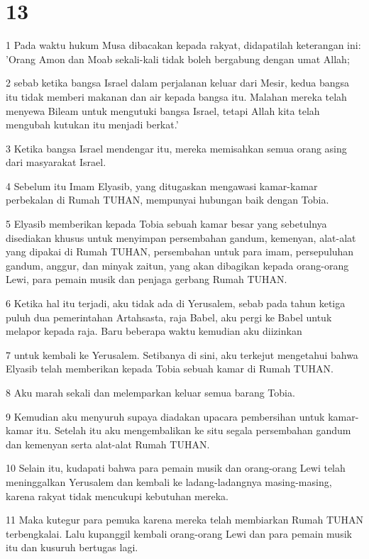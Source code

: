\chapter{13}

\par 1 Pada waktu hukum Musa dibacakan kepada rakyat, didapatilah keterangan ini: 'Orang Amon dan Moab sekali-kali tidak boleh bergabung dengan umat Allah;
\par 2 sebab ketika bangsa Israel dalam perjalanan keluar dari Mesir, kedua bangsa itu tidak memberi makanan dan air kepada bangsa itu. Malahan mereka telah menyewa Bileam untuk mengutuki bangsa Israel, tetapi Allah kita telah mengubah kutukan itu menjadi berkat.'
\par 3 Ketika bangsa Israel mendengar itu, mereka memisahkan semua orang asing dari masyarakat Israel.
\par 4 Sebelum itu Imam Elyasib, yang ditugaskan mengawasi kamar-kamar perbekalan di Rumah TUHAN, mempunyai hubungan baik dengan Tobia.
\par 5 Elyasib memberikan kepada Tobia sebuah kamar besar yang sebetulnya disediakan khusus untuk menyimpan persembahan gandum, kemenyan, alat-alat yang dipakai di Rumah TUHAN, persembahan untuk para imam, persepuluhan gandum, anggur, dan minyak zaitun, yang akan dibagikan kepada orang-orang Lewi, para pemain musik dan penjaga gerbang Rumah TUHAN.
\par 6 Ketika hal itu terjadi, aku tidak ada di Yerusalem, sebab pada tahun ketiga puluh dua pemerintahan Artahsasta, raja Babel, aku pergi ke Babel untuk melapor kepada raja. Baru beberapa waktu kemudian aku diizinkan
\par 7 untuk kembali ke Yerusalem. Setibanya di sini, aku terkejut mengetahui bahwa Elyasib telah memberikan kepada Tobia sebuah kamar di Rumah TUHAN.
\par 8 Aku marah sekali dan melemparkan keluar semua barang Tobia.
\par 9 Kemudian aku menyuruh supaya diadakan upacara pembersihan untuk kamar-kamar itu. Setelah itu aku mengembalikan ke situ segala persembahan gandum dan kemenyan serta alat-alat Rumah TUHAN.
\par 10 Selain itu, kudapati bahwa para pemain musik dan orang-orang Lewi telah meninggalkan Yerusalem dan kembali ke ladang-ladangnya masing-masing, karena rakyat tidak mencukupi kebutuhan mereka.
\par 11 Maka kutegur para pemuka karena mereka telah membiarkan Rumah TUHAN terbengkalai. Lalu kupanggil kembali orang-orang Lewi dan para pemain musik itu dan kusuruh bertugas lagi.
